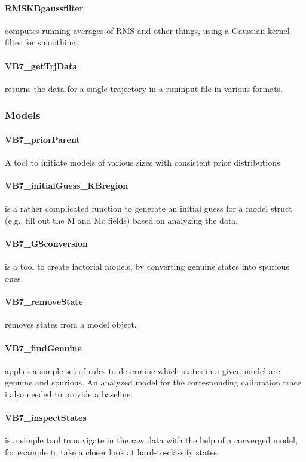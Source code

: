 \paragraph{RMSKBgaussfilter}
computes running averages of RMS and other things, using a Gaussian
kernel filter for smoothing.
\paragraph{VB7\_getTrjData} 
returns the data for a single trajectory in a runinput file in various
formats.

\subsubsection{Models}
\paragraph{VB7\_priorParent} 
A tool to initiate models of various sizes with consistent prior
distributions.
\paragraph{VB7\_initialGuess\_KBregion} 
is a rather complicated function to generate an initial guess for a
model struct (e.g., fill out the M and Mc fields) based on analyzing
the data.
\paragraph{VB7\_GSconversion}
is a tool to create factorial models, by converting genuine states
into spurious ones.
\paragraph{VB7\_removeState}
removes states from a model object.
\paragraph{VB7\_findGenuine}
applies a simple set of rules to determine which states in a given
model are genuine and spurious. An analyzed model for the
corresponding calibration trace i also needed to provide a baseline.
\paragraph{VB7\_inspectStates} 
is a simple tool to navigate in the raw data with the help of a
converged model, for example to take a closer look at hard-to-classify
states.

